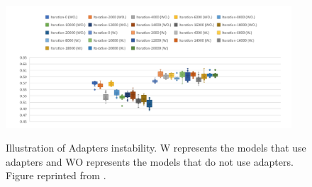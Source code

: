 \begin{figure}[h]
    {\includegraphics[width=0.95\textwidth]{img/adapters_instability.png}}
    \centering
    \caption{Illustration of Adapters instability. W represents the models that use adapters and WO represents the models that do not use adapters. Figure reprinted from \cite{han2021robust}.}
    \label{img:adapters_instability}
\end{figure}




